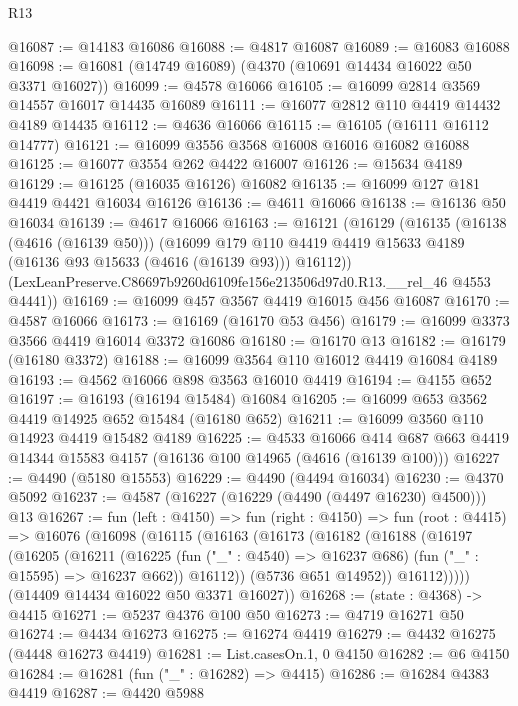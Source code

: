 \begin{lexlean}{R13}
\begin{coremodule}
@16087 := @14183 @16086
@16088 := @4817 @16087
@16089 := @16083 @16088
@16098 := @16081 (@14749 @16089) (@4370 (@10691 @14434 @16022 @50 @3371 @16027))
@16099 := @4578 @16066
@16105 := @16099 @2814 @3569 @14557 @16017 @14435 @16089
@16111 := @16077 @2812 @110 @4419 @14432 @4189 @14435
@16112 := @4636 @16066
@16115 := @16105 (@16111 @16112 @14777)
@16121 := @16099 @3556 @3568 @16008 @16016 @16082 @16088
@16125 := @16077 @3554 @262 @4422 @16007
@16126 := @15634 @4189
@16129 := @16125 (@16035 @16126) @16082
@16135 := @16099 @127 @181 @4419 @4421 @16034 @16126
@16136 := @4611 @16066
@16138 := @16136 @50 @16034
@16139 := @4617 @16066
@16163 := @16121
    (@16129
      (@16135
        (@16138 (@4616 (@16139 @50)))
        (@16099 @179 @110 @4419 @4419 @15633 @4189 (@16136 @93 @15633 (@4616 (@16139 @93))) @16112))
      (LexLeanPreserve.C86697b9260d6109fe156e213506d97d0.R13.__rel_46 @4553 @4441))
@16169 := @16099 @457 @3567 @4419 @16015 @456 @16087
@16170 := @4587 @16066
@16173 := @16169 (@16170 @53 @456)
@16179 := @16099 @3373 @3566 @4419 @16014 @3372 @16086
@16180 := @16170 @13
@16182 := @16179 (@16180 @3372)
@16188 := @16099 @3564 @110 @16012 @4419 @16084 @4189
@16193 := @4562 @16066 @898 @3563 @16010 @4419
@16194 := @4155 @652
@16197 := @16193 (@16194 @15484) @16084
@16205 := @16099 @653 @3562 @4419 @14925 @652 @15484 (@16180 @652)
@16211 := @16099 @3560 @110 @14923 @4419 @15482 @4189
@16225 := @4533
    @16066
    @414
    @687
    @663
    @4419
    @14344
    @15583
    @4157
    (@16136 @100 @14965 (@4616 (@16139 @100)))
@16227 := @4490 (@5180 @15553)
@16229 := @4490 (@4494 @16034)
@16230 := @4370 @5092
@16237 := @4587 (@16227 (@16229 (@4490 (@4497 @16230) @4500))) @13
@16267 := fun (left : @4150) =>
  fun (right : @4150) =>
  fun (root : @4415) =>
  @16076
    (@16098
      (@16115
        (@16163
          (@16173
            (@16182
              (@16188
                (@16197
                  (@16205
                    (@16211
                      (@16225
                        (fun ("_" : @4540) => @16237 @686)
                        (fun ("_" : @15595) => @16237 @662))
                      @16112))
                  (@5736 @651 @14952))
                @16112)))))
      (@14409 @14434 @16022 @50 @3371 @16027))
@16268 := (state : @4368) -> @4415
@16271 := @5237 @4376 @100 @50
@16273 := @4719 @16271 @50
@16274 := @4434 @16273
@16275 := @16274 @4419
@16279 := @4432 @16275 (@4448 @16273 @4419)
@16281 := List.casesOn.{1, 0} @4150
@16282 := @6 @4150
@16284 := @16281 (fun ("_" : @16282) => @4415)
@16286 := @16284 @4383 @4419
@16287 := @4420 @5988

\end{coremodule}
\end{lexlean}
